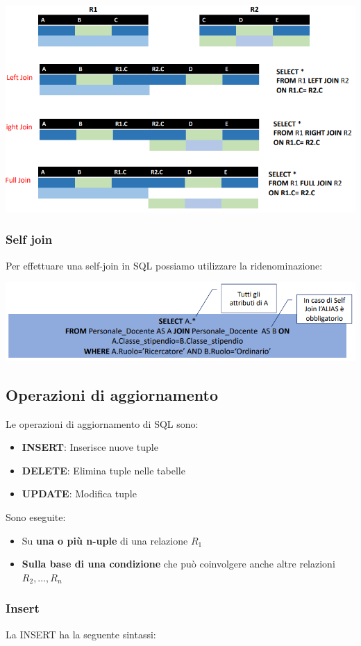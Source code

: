\documentclass[12pt]{article}
\begin{document}
\begin{center}
    \includegraphics[width = 1.10\textwidth]{Images/202.PNG}
\end{center}
\subsubsection{Self join}
Per effettuare una self-join in SQL possiamo utilizzare la ridenominazione:
\begin{center}
    \includegraphics[width = 1\textwidth]{Images/203.PNG}
\end{center}
\subsection{Operazioni di aggiornamento}
Le operazioni di aggiornamento di SQL sono:
\begin{itemize}
    \item \textbf{INSERT}: Inserisce nuove tuple
    \item \textbf{DELETE}: Elimina tuple nelle tabelle
    \item \textbf{UPDATE}: Modifica tuple
\end{itemize}
Sono eseguite:
\begin{itemize}
    \item Su \textbf{una o più n-uple} di una relazione $R_1$
    \item \textbf{Sulla base di una condizione} che può coinvolgere anche altre relazioni $R_2, \dots, R_n$
\end{itemize}
\subsubsection{Insert}
La INSERT ha la seguente sintassi:
\end{document}
